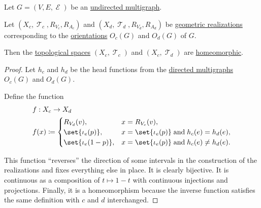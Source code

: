 \begin{proposition}\label{thm:undirected_multigraph_geometric_realizations_homeomorphic}
  Let \( G = (V, E, \mscrE) \) be an \hyperref[def:undirected_multigraph]{undirected multigraph}.

  Let \( (X_c, \mscrT_c, R_{V_c}, R_{A_c}) \) and \( (X_d, \mscrT_d, R_{V_d}, R_{A_d}) \) be \hyperref[def:graph_geometric_realization/undirected]{geometric realizations} corresponding to the \hyperref[def:multigraph_orientation]{orientations} \( O_c(G) \) and \( O_d(G) \) of \( G \).

  Then the \hyperref[def:topological_space]{topological spaces} \( (X_c, \mscrT_c) \) and \( (X_c, \mscrT_d) \) are \hyperref[def:homeomorphism]{homeomorphic}.
\end{proposition}
\begin{proof}
  Let \( h_c \) and \( h_d \) be the head functions from the \hyperref[def:directed_multigraph]{directed multigraphs} \( O_c(G) \) and \( O_d(G) \).

  Define the function
  \begin{equation*}
    \begin{aligned}
      &f: X_c \to X_d \\
      &f(x) \coloneqq \begin{cases}
        R_{V_d}(v),             &x = R_{V_c}(v), \\
        \set{ \iota_e(p) },     &x = \set{ \iota_e(p) } \T{and} h_c(e) = h_d(e), \\
        \set{ \iota_e(1 - p) }, &x = \set{ \iota_e(p) } \T{and} h_c(e) \neq h_d(e).
      \end{cases}
    \end{aligned}
  \end{equation*}

  This function \enquote{reverses} the direction of some intervals in the construction of the realizations and fixes everything else in place. It is clearly bijective. It is continuous as a composition of \( t \mapsto 1 - t \) with continuous injections and projections. Finally, it is a homeomorphism because the inverse function satisfies the same definition with \( c \) and \( d \) interchanged.
\end{proof}

